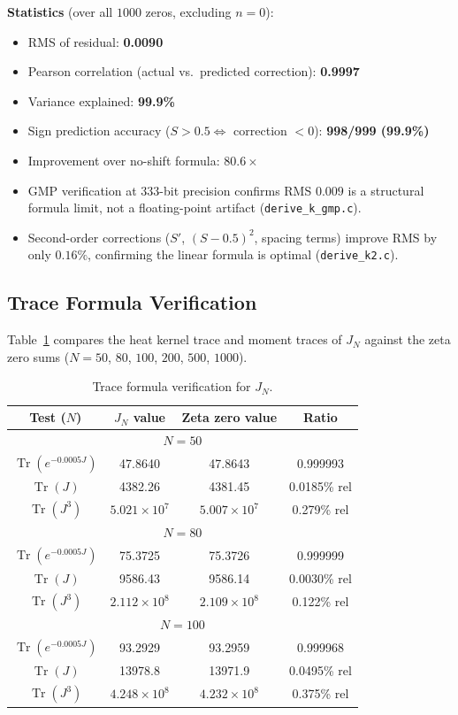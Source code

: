 \documentclass{pre-aomart}
\theoremstyle{plain}
\theoremstyle{definition}
\theoremstyle{remark}
\begin{document}
\noindent\textbf{Statistics} (over all $1000$ zeros, excluding $n=0$):
\begin{itemize}
\item RMS of residual: \textbf{0.0090}
\item Pearson correlation (actual vs.\ predicted correction): \textbf{0.9997}
\item Variance explained: \textbf{99.9\%}
\item Sign prediction accuracy ($S > 0.5 \iff$ correction $< 0$): \textbf{998/999 (99.9\%)}
\item Improvement over no-shift formula: \textbf{$80.6\times$}
\item GMP verification at $333$-bit precision confirms RMS $0.009$ is a
      structural formula limit, not a floating-point artifact
(\texttt{derive\_k\_gmp.c}).
\item Second-order corrections ($S'$, $(S-0.5)^2$, spacing terms) improve
      RMS by only $0.16\%$, confirming the linear formula is optimal
      (\texttt{derive\_k2.c}).
\end{itemize}

\subsection{Trace Formula Verification}

Table~\ref{tab:trace} compares the heat kernel trace and moment traces
of $J_N$ against the zeta zero sums ($N = 50$, $80$, $100$, $200$, $500$, $1000$).

\begin{table}[htbp]
\centering
\caption{Trace formula verification for $J_N$.}
\label{tab:trace}
\begin{tabular}{cccc}
\toprule
Test ($N$) & $J_N$ value & Zeta zero value & Ratio \\
\midrule
\multicolumn{4}{c}{$N = 50$} \\
$\operatorname{Tr}(e^{-0.0005 J})$ & 47.8640 & 47.8643 & 0.999993 \\
$\operatorname{Tr}(J)$    & 4382.26 & 4381.45 & 0.0185\% rel \\
$\operatorname{Tr}(J^3)$  & $5.021\times 10^7$ & $5.007\times 10^7$ & 0.279\% rel \\
\midrule
\multicolumn{4}{c}{$N = 80$} \\
$\operatorname{Tr}(e^{-0.0005 J})$ & 75.3725 & 75.3726 & 0.999999 \\
$\operatorname{Tr}(J)$    & 9586.43 & 9586.14 & 0.0030\% rel \\
$\operatorname{Tr}(J^3)$  & $2.112\times 10^8$ & $2.109\times 10^8$ & 0.122\% rel \\
\midrule
\multicolumn{4}{c}{$N = 100$} \\
$\operatorname{Tr}(e^{-0.0005 J})$ & 93.2929 & 93.2959 & 0.999968 \\
$\operatorname{Tr}(J)$    & 13978.8 & 13971.9 & 0.0495\% rel \\
$\operatorname{Tr}(J^3)$  & $4.248\times 10^8$ & $4.232\times 10^8$ & 0.375\% rel \\
\bottomrule
\end{tabular}
\end{table}
\end{document}
